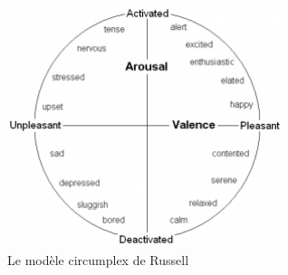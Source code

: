 \begin{figure}
  \centering
  \includegraphics[width=8cm]{./Chapitre1/figures/Circumplex.png}
  \caption{Le modèle circumplex de Russell~\cite{Russell1980}}
  \label{fig:Circumplex}
\end{figure}
